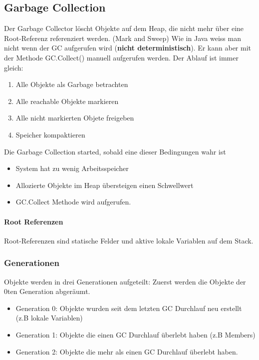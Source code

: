 \documentclass[
a4paper,
oneside,
10pt,
fleqn,
headsepline,
toc=listofnumbered, 
bibliography=totocnumbered]{scrartcl}
\begin{document}
\subsection{Garbage Collection}
Der Garbage Collector löscht Objekte auf dem Heap, die nicht mehr über eine Root-Referenz referenziert werden. (Mark and Sweep) Wie in Java weiss man nicht wenn der GC aufgerufen wird (\textbf{nicht deterministisch}). Er kann aber mit der Methode GC.Collect() manuell aufgerufen werden. Der Ablauf ist immer gleich:
\begin{enumerate}
	\item Alle Objekte als Garbage betrachten
	\item Alle reachable Objekte markieren
	\item Alle nicht markierten Objete freigeben
	\item Speicher kompaktieren
\end{enumerate}

Die Garbage Collection started, sobald eine dieser Bedingungen wahr ist
\begin{itemize}
	\item System hat zu wenig Arbeitsspeicher
	\item Allozierte Objekte im Heap übersteigen einen Schwellwert
	\item GC.Collect Methode wird aufgerufen.
\end{itemize}

\paragraph{Root Referenzen}
Root-Referenzen sind statische Felder und aktive lokale Variablen auf dem Stack.

\subsubsection{Generationen}
Objekte werden in drei Generationen aufgeteilt: Zuerst werden die Objekte der 0ten Generation abgeräumt.
\begin{itemize}
	\item Generation 0: Objekte wurden seit dem letzten GC Durchlauf neu erstellt (z.B lokale Variablen)
	\item Generation 1: Objekte die einen GC Durchlauf überlebt haben (z.B Members)
	\item Generation 2: Objekte die mehr als einen GC Durchlauf überlebt haben.
\end{itemize}
\end{document}

